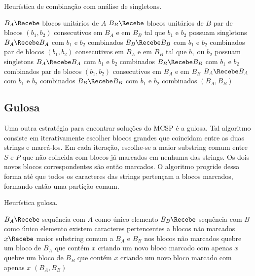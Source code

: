         \begin{algorithm}[htb]
        \caption{Heurística de combinação com análise de singletons.}
        \label{alg:combineS}

        \begin{codebox}
        \li $B_A \Recebe$ blocos unitários de $A$
        \li $B_B \Recebe$ blocos unitários de $B$
        \li \Para \Cada par de blocos $(b_1, b_2)$ consecutivos em $B_A$ e em $B_B$
        \zi tal que $b_1$ e $b_2$ possuam singletons \Faca
            \Do
        \li     $B_A \Recebe B_A$ com $b_1$ e $b_2$ combinados
        \li     $B_B \Recebe B_B$ com $b_1$ e $b_2$ combinados
            \End
        \li \Para \Cada par de blocos $(b_1, b_2)$ consecutivos em $B_A$ e em $B_B$
        \zi tal que $b_1$ ou $b_2$ possuam singletons \Faca
            \Do
        \li     $B_A \Recebe B_A$ com $b_1$ e $b_2$ combinados
        \li     $B_B \Recebe B_B$ com $b_1$ e $b_2$ combinados
            \End
        \li \Para \Cada par de blocos $(b_1, b_2)$ consecutivos em $B_A$ e em $B_B$ \Faca
            \Do
        \li     $B_A \Recebe B_A$ com $b_1$ e $b_2$ combinados
        \li     $B_B \Recebe B_B$ com $b_1$ e $b_2$ combinados
            \End
        \li \Devolva $(B_A, B_B)$
        \end{codebox}
    \end{algorithm}

\subsection{Gulosa}

    Uma outra estratégia para encontrar soluções do MCSP é a gulosa. Tal algoritmo consiste em iterativamente escolher blocos grandes que coincidam entre as duas strings e marcá-los. Em cada iteração, escolhe-se a maior substring comum entre $S$ e $P$ que não coincida com blocos já marcados em nenhuma das strings. Os dois novos blocos correspondentes são então marcados. O algoritmo progride dessa forma até que todos os caracteres das strings pertençam a blocos marcados, formando então uma partição comum.

    \begin{algorithm}[htb]
        \caption{Heurística gulosa.}
        \label{alg:greedy}

        \begin{codebox}
        \li $B_A \Recebe$ sequência com $A$ como único elemento
        \li $B_B \Recebe$ sequência com $B$ como único elemento
        \li \Enquanto existem caracteres pertencentes a blocos não marcados \Faca
            \Do
        \li     $x \Recebe$ maior substring comum a $B_A$ e $B_B$ nos blocos não marcados
        \li     quebre um bloco de $B_A$ que contém $x$ criando um novo bloco marcado com apenas $x$
        \li     quebre um bloco de $B_B$ que contém $x$ criando um novo bloco marcado com apenas $x$
            \End
        \li \Devolva $(B_A, B_B)$
        \end{codebox}
    \end{algorithm}

